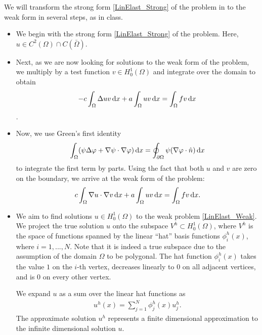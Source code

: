 \begin{problem}{1}
\begin{solution}

We will transform the strong form \eqref{LinElast_Strong} of the problem
in to the weak form in several steps, as in class.

\begin{itemize}

\item We begin with the strong form \eqref{LinElast_Strong} of the problem.
Here, $u\in C^2(\Omega) \cap C(\bar{\Omega})$.

\item Next, as we are now looking for solutions to the weak form of the
problem, we multiply by a test function
$v \in H^1_0(\Omega)$ and
integrate over the domain to obtain
$$ -c \int_\Omega \mbox{$\Delta$} u v \operatorname{d}\!{x} + a \int_\Omega u v \operatorname{d}\!{x}
= \int_\Omega f v \operatorname{d}\!{x} $$.

\item Now, we use Green's first identity
\begin{align*}
    \int_\Omega (\psi \mbox{$\Delta$} \varphi + 
    \nabla \psi \cdot \nabla \varphi) \operatorname{d}\!{x} =
    \oint_{\partial\Omega} \psi (\nabla \varphi \cdot \hat{n}) \operatorname{d}\!{x}
\end{align*}
to integrate the first term by parts. Using the fact that both $u$ and
$v$ are zero on the boundary, we arrive at the weak form of the problem:
\begin{align}\label{LinElast_Weak}
c \int_\Omega \nabla u \cdot \nabla v \operatorname{d}\!{x} + 
a \int_\Omega u v \operatorname{d}\!{x} = 
\int_\Omega f v \operatorname{d}\!{x}.
\end{align}

\item We aim to find solutions $u \in H^1_0(\Omega)$ to the weak
problem \eqref{LinElast_Weak}. We project the true solution
$u$ onto the subspace $V^h \subset H^1_0(\Omega)$,
where $V^h$ is the space of functions spanned
by the linear ``hat'' basis functions $\phi_i^h(x)$,
where $i=1,...,N$.
Note that it is indeed a true subspace due to the assumption of the domain
$\Omega$ to be polygonal.
The hat function $\phi_i^h(x)$ takes the value $1$ on the $i$-th vertex,
decreases linearly to $0$ on all adjacent vertices,
and is $0$ on every other vertex.

We expand $u$ as a sum over the linear hat functions as
\begin{align*}
    u^h(x) = \sum_{j=1}^N \phi_j^h(x) u_j^h.
\end{align*}
The approximate solution $u^h$ represents a finite dimensional
approximation to the infinite dimensional solution $u$.


\end{itemize}
\end{solution}
\end{problem}
